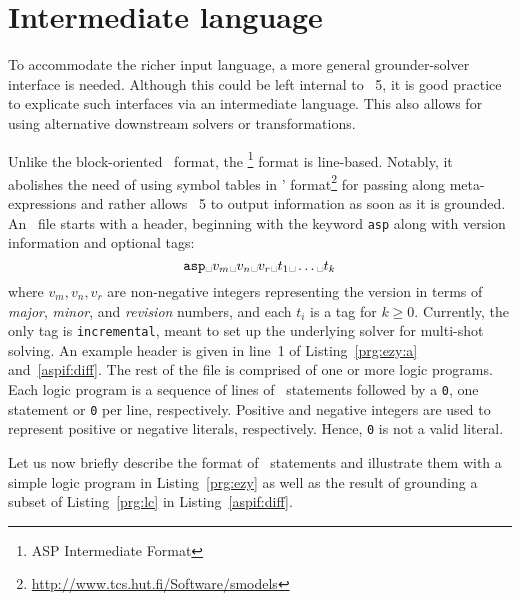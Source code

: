 
\section{Intermediate language}
\label{sec:aspif}
\newcommand\Space{\text{\textvisiblespace}}%

To accommodate the richer input language, a more general grounder-solver interface is needed.
Although this could be left internal to \clingo~5,
it is good practice to explicate such interfaces via an intermediate language.
This also allows for using alternative downstream solvers or transformations.

Unlike the block-oriented \smodels\ format,
the \aspif\footnote{ASP Intermediate Format} format is line-based.
Notably, it abolishes the need of using symbol tables in \smodels' format\footnote{\url{http://www.tcs.hut.fi/Software/smodels}}
for passing along meta-expressions and rather allows \gringo~5 to output information as soon as it is grounded.
An \aspif\ file starts with a header, beginning with the keyword \lstinline{asp}
along with version information and optional tags:
\[\texttt{asp} \Space v_m \Space v_n \Space v_r \Space t_1 \Space \dots \Space t_k \]
where $v_m,v_n,v_r$ are non-negative integers representing the version in terms of \textit{major}, \textit{minor}, and \textit{revision} numbers,
and each $t_i$ is a tag for $k\geq 0$.
Currently, the only tag is \lstinline{incremental}, meant to set up the underlying solver for multi-shot solving.
An example header is given in line~1 of Listing~\ref{prg:ezy:a} and~\ref{aspif:diff}.
%
The rest of the file is comprised of one or more logic programs.
Each logic program is a sequence of lines of \aspif\ statements followed by a \lstinline{0}, one statement or \lstinline{0} per line, respectively.
%
Positive and negative integers are used to represent positive or  negative literals, respectively.
Hence, \lstinline{0} is not a valid literal.

Let us now briefly describe the format of \aspif\ statements and illustrate them with a
simple logic program in Listing~\ref{prg:ezy} as well as the result of grounding a subset of Listing~\ref{prg:lc}
in Listing~\ref{aspif:diff}. %

